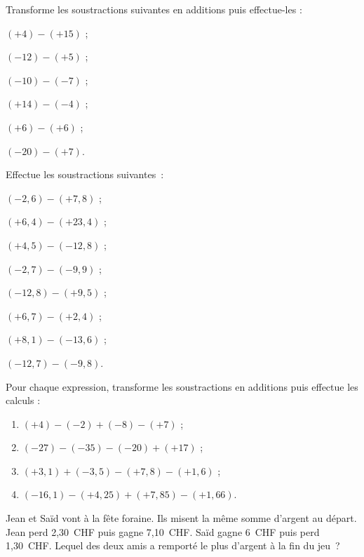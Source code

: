 \begin{exercice}
Transforme les soustractions suivantes en additions puis effectue-les :
\begin{colenumerate}{2}
 \item $(+4) - (+15)$ ;
 \item $(-12) - (+5)$ ;
 \item $(-10) - (-7)$ ;
 \item $(+14) - (-4)$ ;
 \item $(+6) - (+6)$ ;
 \item $(-20) - (+7)$.
 \end{colenumerate}
\end{exercice}


\begin{exercice}
Effectue les soustractions suivantes :
\begin{colenumerate}{2}
 \item $(-2,6) - (+7,8)$ ;
 \item $(+6,4) - (+23,4)$ ;
 \item $(+4,5) - (-12,8)$ ;
 \item $(-2,7) - (-9,9)$ ;
 \item $(-12,8) - (+9,5)$ ;
 \item $(+6,7) - (+2,4)$ ;
 \item $(+8,1) - (-13,6)$ ;
 \item $(-12,7) - (-9,8)$.
 \end{colenumerate}
\end{exercice}


\begin{exercice}
Pour chaque expression, transforme les soustractions en additions puis effectue les calculs :
\begin{enumerate}
 \item $(+4) - (-2) + (-8) - (+7)$ ;
 \item $(-27) - (-35) - (-20) + (+17)$ ;
 \item $(+3,1) + (-3,5) - (+7,8) - (+1,6)$ ;
 \item $(-16,1) - (+4,25) + (+7,85) - (+1,66)$.
 \end{enumerate}
\end{exercice}


\begin{exercice}
Jean et Saïd vont à la fête foraine. Ils misent la même somme d'argent au départ. Jean perd 2,30 CHF puis gagne 7,10 CHF. Saïd gagne 6 CHF puis perd 1,30 CHF. Lequel des deux amis a remporté le plus d'argent à la fin du jeu ?
\end{exercice}


